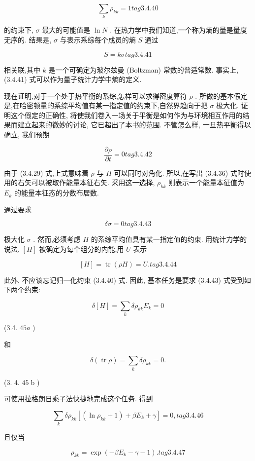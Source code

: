 $$
\mathop{\sum }\limits_{k}{\rho }_{kk} = 1 tag{3.4.40}
$$

的约束下, $\sigma$ 最大的可能值是 $\ln N$ . 在热力学中我们知道,一个称为熵的量是量度无序的. 结果是, $\sigma$ 与表示系综每个成员的熵 $S$ 通过

$$
S = {k\sigma } tag{3. 4.41}
$$

相关联,其中 $k$ 是一个可确定为玻尔兹曼 (Boltzman) 常数的普适常数. 事实上, (3.4.41) 式可以作为量子统计力学中熵的定义.

现在证明,对于一个处于热平衡的系综,怎样可以求得密度算符 $\rho$ . 所做的基本假定是,在哈密顿量的系综平均值有某一指定值的约束下,自然界趋向于把 $\sigma$ 极大化. 证明这个假定的正确性, 将使我们卷入一场关于平衡是如何作为与环境相互作用的结果而建立起来的微妙的讨论, 它已超出了本书的范围. 不管怎么样, 一旦热平衡得以确立, 我们预期

$$
\frac{\partial \rho }{\partial t} = 0 tag{3. 4.42}
$$

由于 (3.4.29) 式,上式意味着 $\rho$ 与 $H$ 可以同时对角化. 所以,在写出 (3.4.36) 式时使用的右矢可以被取作能量本征右矢. 采用这一选择, ${\rho }_{kk}$ 则表示一个能量本征值为 ${E}_{k}$ 的能量本征态的分数布居数.

通过要求

$$
{\delta \sigma } = 0 tag{3. 4.43}
$$

极大化 $\sigma$ . 然而,必须考虑 $H$ 的系综平均值具有某一指定值的约束. 用统计力学的说法, $\left\lbrack H\right\rbrack$ 被确定为每个组分的内能,用 $U$ 表示

$$
\left\lbrack H\right\rbrack = \operatorname{tr}\left( {\rho H}\right) = U. tag{3. 4.44}
$$

此外, 不应该忘记归一化约束 (3.4.40) 式. 因此, 基本任务是要求 (3.4.43) 式受到如下两个约束:

$$
\delta \left\lbrack H\right\rbrack = \mathop{\sum }\limits_{k}\delta {\rho }_{kk}{E}_{k} = 0
$$

(3.4. ${45a}$ )

和

$$
\delta \left( {\operatorname{tr}\rho }\right) = \mathop{\sum }\limits_{k}\delta {\rho }_{kk} = 0.
$$

(3. 4. ${45}\mathrm{\;b}$ )

可使用拉格朗日乘子法快捷地完成这个任务. 得到

$$
\mathop{\sum }\limits_{k}\delta {\rho }_{kk}\left\lbrack {\left( {\ln {\rho }_{kk} + 1}\right) + \beta {E}_{k} + \gamma }\right\rbrack = 0, tag{3.4.46}
$$

且仅当

$$
{\rho }_{kk} = \exp \left( {-\beta {E}_{k} - \gamma - 1}\right) . tag{3. 4.47}
$$

